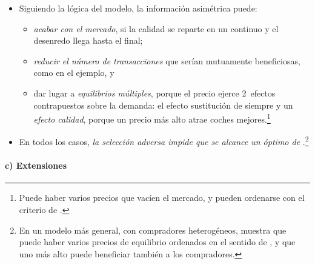 \documentclass[11pt]{article}
\begin{document}
\begin{itemize}
\item Siguiendo la lógica del modelo, la información asimétrica puede:
  \begin{itemize}
  \item \emph{acabar con el mercado}, si la calidad se reparte en un continuo y el desenredo llega hasta el final;
  \item \emph{reducir el número de transacciones} que serían mutuamente beneficiosas, como en el ejemplo, y
  \item dar lugar a \emph{equilibrios múltiples}, porque el precio ejerce 2~efectos contrapuestos sobre la demanda: el efecto sustitución de siempre y un \emph{efecto calidad}, porque un precio más alto atrae coches mejores.\footnote{Puede haber varios precios que vacíen el mercado, y pueden ordenarse con el criterio de .}
  \end{itemize}
\item En todos los casos, \emph{la selección adversa impide que se alcance un óptimo de }.\footnote{En un modelo más general, con compradores heterogéneos, \textcite{Wilson1980Nature} muestra que puede haber varios precios de equilibrio ordenados en el sentido de , y que uno más alto puede beneficiar también a los compradores.}
\end{itemize}

\paragraph{c) Extensiones}
\end{document}
